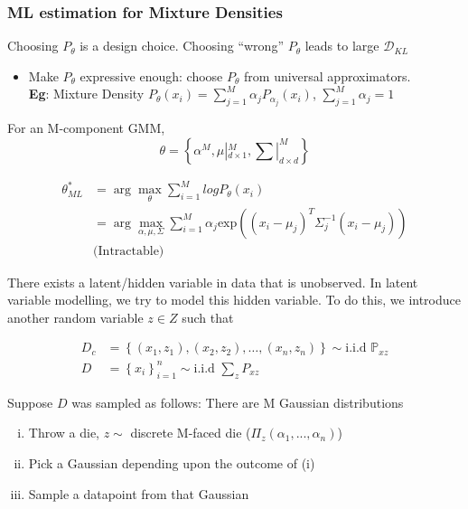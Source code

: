 \documentclass[11pt]{article}
\begin{document}
\subsubsection{ML estimation for Mixture Densities}
\label{sec:ml-estim-mixt}

Choosing $P_{\theta}$ is a design choice. Choosing ``wrong'' $P_{\theta}$ leads to large $\mathcal{D}_{KL}$
\begin{itemize}
\item Make $P_{\theta}$ expressive enough: choose $P_{\theta}$ from universal approximators. \\
  \textbf{Eg}: Mixture Density $P_{\theta}(x_i) = \sum_{j=1}^M \alpha_j P_{\alpha_j} (x_i)$, $\sum_{j=1}^M \alpha_j = 1$
\end{itemize}

For an M-component GMM,
\[ \theta = \left\{ \alpha^M, \mu|_{d \times 1}^M, \sum|_{d \times d}^M \right\} \]

\begin{align*}
  \theta^{*}_{ML} &= \arg\max_{\theta} \sum_{i=1}^Mlog P_{\theta}(x_i) \\
                  &= \arg\max_{\alpha, \mu, \Sigma} \sum_{i=1}^M \alpha_j \text{exp}((x_i - \mu_j)^T\Sigma_j^{-1}(x_i - \mu_j)) \\
                  & \text{(Intractable)}
\end{align*}



There exists a latent/hidden variable in data that is unobserved. In latent variable modelling, we try to model this hidden variable. To do this, we introduce another random variable $z \in Z$ such that

\begin{align*}
  D_c &= \left\{ (x_1, z_1), (x_2, z_2), \dots, (x_n, z_n) \right\} \sim \text{i.i.d } \mathbb{P}_{xz} \\
  D &= \left\{ x_i \right\}^n_{i=1} \sim \text{i.i.d } \sum_z P_{xz}
\end{align*}

Suppose $D$ was sampled as follows:
There are M Gaussian distributions
\begin{enumerate}[(i)]
\item Throw a die, $z \sim $ discrete M-faced die ($\Pi_z(\alpha_1, ..., \alpha_n)$)
\item Pick a Gaussian depending upon the outcome of (i)
\item Sample a datapoint from that Gaussian
\end{enumerate}
\end{document}
